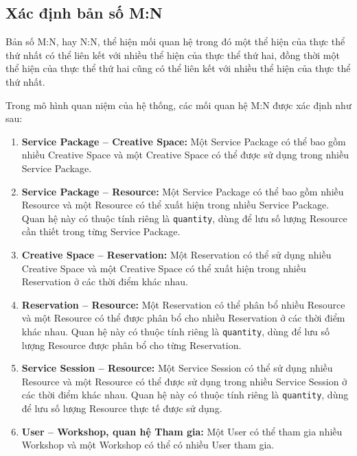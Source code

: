\subsection{Xác định bản số M:N}

Bản số M:N, hay N:N, thể hiện mối quan hệ trong đó một thể hiện của thực thể thứ nhất có thể liên kết với nhiều thể hiện của thực thể thứ hai, đồng thời một thể hiện của thực thể thứ hai cũng có thể liên kết với nhiều thể hiện của thực thể thứ nhất.

Trong mô hình quan niệm của hệ thống, các mối quan hệ M:N được xác định như sau:

\begin{enumerate}

\item \textbf{Service Package -- Creative Space:} Một Service Package có thể bao gồm nhiều Creative Space và một Creative Space có thể được sử dụng trong nhiều Service Package.

\item \textbf{Service Package -- Resource:} Một Service Package có thể bao gồm nhiều Resource và một Resource có thể xuất hiện trong nhiều Service Package. Quan hệ này có thuộc tính riêng là \texttt{quantity}, dùng để lưu số lượng Resource cần thiết trong từng Service Package.

\item \textbf{Creative Space -- Reservation:} Một Reservation có thể sử dụng nhiều Creative Space và một Creative Space có thể xuất hiện trong nhiều Reservation ở các thời điểm khác nhau.

\item \textbf{Reservation -- Resource:} Một Reservation có thể phân bổ nhiều Resource và một Resource có thể được phân bổ cho nhiều Reservation ở các thời điểm khác nhau. Quan hệ này có thuộc tính riêng là \texttt{quantity}, dùng để lưu số lượng Resource được phân bổ cho từng Reservation.

\item \textbf{Service Session -- Resource:} Một Service Session có thể sử dụng nhiều Resource và một Resource có thể được sử dụng trong nhiều Service Session ở các thời điểm khác nhau. Quan hệ này có thuộc tính riêng là \texttt{quantity}, dùng để lưu số lượng Resource thực tế được sử dụng.

\item \textbf{User -- Workshop, quan hệ Tham gia:} Một User có thể tham gia nhiều Workshop và một Workshop có thể có nhiều User tham gia.

\end{enumerate}

